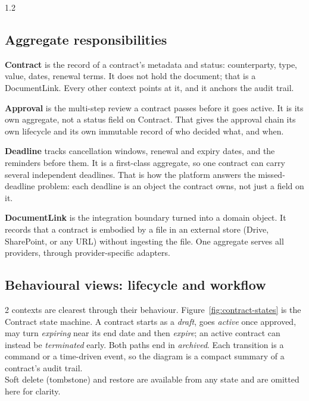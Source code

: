 \begin{spacing}{1.2}

\subsection{Aggregate responsibilities}
\label{sec:aggregate-responsibilities}

\textbf{Contract} is the record of a contract's metadata and status:
counterparty, type, value, dates, renewal terms. It does not hold the
document; that is a DocumentLink. Every other context points at it, and it
anchors the audit trail.

\textbf{Approval} is the multi-step review a contract passes before it goes
active. It is its own aggregate, not a status field on Contract. That gives
the approval chain its own lifecycle and its own immutable record of who
decided what, and when.

\textbf{Deadline} tracks cancellation windows, renewal and expiry dates, and
the reminders before them. It is a first-class aggregate, so one
contract can carry several independent deadlines. That is how the platform
answers the missed-deadline problem: each deadline is an object the contract
owns, not just a field on it.

\textbf{DocumentLink} is the integration boundary turned into a domain
object. It records that a contract is embodied by a file in an external
store (Drive, SharePoint, or any URL) without ingesting the file. One
aggregate serves all providers, through provider-specific adapters.

\subsection{Behavioural views: lifecycle and workflow}
\label{sec:behavioural-views}

2 contexts are clearest through their behaviour.
Figure~\ref{fig:contract-states} is the Contract state machine. A contract
starts as a \textit{draft}, goes \textit{active} once approved, may turn
\textit{expiring} near its end date and then \textit{expire}; an active
contract can instead be \textit{terminated} early. Both paths end in
\textit{archived}. Each transition is a command or a time-driven event, so the diagram
is a compact summary of a contract's audit trail.
\\Soft delete (tombstone) and restore are available from any state and are omitted
 here for clarity.


\end{spacing}
